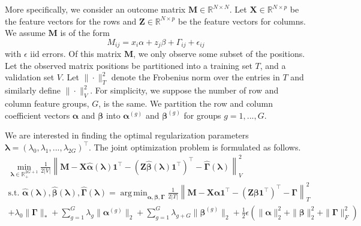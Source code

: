 \documentclass[12pt]{article}
\DeclareMathOperator*{\argmin}{arg\,min}
\begin{document}
More specifically, we consider an outcome matrix $\boldsymbol{M} \in \mathbb{R}^{N\times N}$. Let $\boldsymbol{X}\in \mathbb{R}^{N \times p}$ be the feature vectors for the rows and $\boldsymbol{Z} \in \mathbb{R}^{N \times p}$ be the feature vectors for columns. We assume $\boldsymbol{M}$ is of the form
\begin{equation}
M_{ij} = x_i \alpha + z_j \beta + \Gamma_{ij} + \epsilon_{ij}
\end{equation}
with $\epsilon$ iid errors. Of this matrix $\boldsymbol{M}$, we only observe some subset of the positions. Let the observed matrix positions be partitioned into a training set $T$, and a validation set $V$. Let $\| \cdot \|^2_T$ denote the Frobenius norm over the entries in $T$ and similarly define $\| \cdot \|^2_V$. For simplicity, we suppose the number of row and column feature groups, $G$, is the same. We partition the row and column coefficient vectors $\boldsymbol{\alpha}$ and $\boldsymbol{\beta}$ into $\boldsymbol{\alpha}^{(g)}$ and $\boldsymbol{\beta}^{(g)}$ for groups $g=1,...,G$. 

We are interested in finding the optimal regularization parameters $\boldsymbol{\lambda} = (\lambda_0, \lambda_1, ...,  \lambda_{2G})^\top$. The joint optimization problem is formulated as follows.
\begin{equation}
	\begin{array}{c}
		\min_{\boldsymbol{\lambda} \in \mathbb{R}^{2G+1}_{+}} \frac{1}{2|V|}
		\left \| 
		\boldsymbol{M} 
		- \boldsymbol{X} \hat{\boldsymbol{\alpha}}(\boldsymbol{\lambda})  \boldsymbol{1}^\top 
		- (\boldsymbol{Z} \hat{\boldsymbol{\beta}}(\boldsymbol{\lambda})  \boldsymbol{1}^\top )^\top
		- \hat{\boldsymbol{\Gamma}}(\boldsymbol{\lambda})
		\right \|^2_V \\
		\text{s.t. }
		\hat{\boldsymbol{\alpha}}(\boldsymbol{\lambda}),
		\hat{\boldsymbol{\beta}}(\boldsymbol{\lambda}),
		\hat{\boldsymbol{\Gamma}}(\boldsymbol{\lambda})
		 =
		\argmin_{\boldsymbol{\alpha}, \boldsymbol{\beta}, \boldsymbol{\Gamma}} 
		\frac{1}{2|T|} 
		\left \| 
		\boldsymbol{M} 
		- \boldsymbol{X} \boldsymbol{\alpha} \boldsymbol{1}^\top 
		- (\boldsymbol{Z} \boldsymbol{\beta} \boldsymbol{1}^\top )^\top
		- \boldsymbol{\Gamma}
		\right \|^2_T \\
		+ \lambda_0 \| \boldsymbol\Gamma \|_*
		+ \sum_{g=1}^G \lambda_g \| \boldsymbol\alpha^{(g)} \|_2
		+ \sum_{g=1}^G  \lambda_{g+G} \| \boldsymbol\beta^{(g)} \|_2
		+ \frac{1}{2} \epsilon \left (
		\| \boldsymbol\alpha \|_2^2 + \| \boldsymbol\beta \|_2^2
		+ \| \boldsymbol{\Gamma}\|^2_F
		\right )
	\end{array}
	\label{eq:matrix_comp_groups}
\end{equation}
\end{document}
